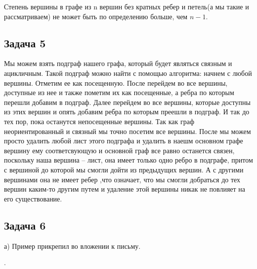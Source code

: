	Степень вершины в графе из n вершин без кратных ребер и петель(а мы такие и рассматриваем) не может быть по определению больше, чем $n-1$.
	
	\subsection{Задача 5}
	Мы можем взять подграф нашего графа, который будет являться связным и ацикличным. Такой подграф можно найти с помощью алгоритма: начнем с любой вершины. Отметим ее как посещенную. После перейдем во все вершины, доступные из нее и также пометим их как посещенные, а ребра по которым перешли добавим в подграф. Далее перейдем во все вершины, которые доступны из этих вершин и опять добавим ребра по которым преешли в подграф. И так до тех пор, пока останутся непосещенные вершины. Так как граф неориентированный и связный мы точно посетим все вершины. После мы можем просто удалить любой лист этого подграфа и удалить в наешм основном графе вершину ему соответсвующую и основной граф все равно останется связен, поскольку наша вершина -- лист, она имеет только одно ребро в подграфе, притом с вершиной до которой мы смогли дойти из предыдущих вершин. А с другими вершинами она не имеет ребер ,что означает, что мы смогли добраться до тех вершин каким-то другим путем и удаление этой вершины никак не повлияет на его существование.  
	
	\subsection{Задача 6}
	а) Пример прикрепил во вложении к письму.
	
.	
	